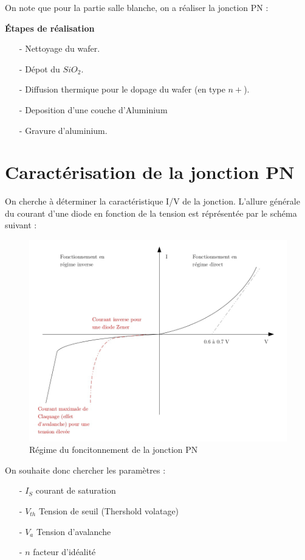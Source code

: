 \documentclass[11pt]{article}
\begin{document}
On note que pour la partie salle blanche, on a r\'ealiser la jonction PN :

\textbf{\'Etapes de r\'ealisation}
\begin{itemize}
\item[-] Nettoyage du wafer.
\item[-] D\'epot du $SiO_2$.
\item[-] Diffusion thermique pour le dopage du wafer (en type $n+$).
\item[-] Deposition d'une couche d'Aluminium
\item[-] Gravure d'aluminium.
\end{itemize}

\section{Caract\'erisation de la jonction PN}
On cherche \`a d\'eterminer la caract\'eristique I/V de la jonction.
L'allure g\'en\'erale du courant d'une diode en fonction de la tension est r\'epr\'esent\'ee par le sch\'ema suivant :

\begin{figure}[!htb]
\centering
\includegraphics[scale=0.54]{carac_I_V.jpg}
\caption{R\'egime du foncitonnement de la jonction PN}
\end{figure}

On souhaite donc chercher les param\`etres : 
\begin{itemize}
\item[-] $I_S$ courant de saturation
\item[-] $V_{th}$ Tension de seuil (Thershold volatage)
\item[-] $V_a$  Tension d'avalanche
\item[-] $n$ facteur d'id\'ealit\'e
\end{itemize}
\clearpage
\end{document}
